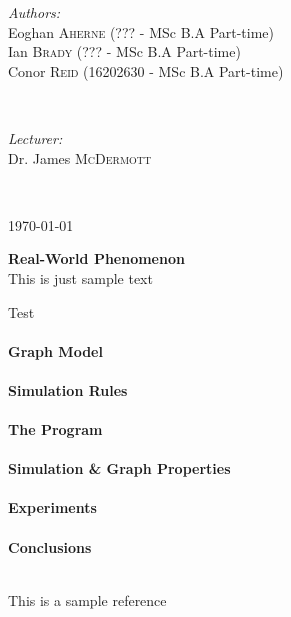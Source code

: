 \documentclass[paper=a4, fontsize=11pt]{scrartcl} %
\begin{document}
\begin{titlepage}
\begin{minipage}{0.4\textwidth}
\begin{flushleft} \large
\emph{Authors:}\\
\small{
Eoghan \textsc{Aherne} (??? - MSc B.A Part-time)
\\ Ian \textsc{Brady} (??? - MSc B.A Part-time)
\\Conor \textsc{Reid} (16202630 - MSc B.A Part-time)
} %
\end{flushleft}
\end{minipage}
~
\begin{minipage}{0.4\textwidth}
\begin{flushright} \large
\emph{Lecturer:} \\
Dr. James \textsc{McDermott} %
\end{flushright}
\end{minipage}\\[4cm]


\vspace{5cm}

{\large \today}\\[3cm] %

\vfill %

\end{titlepage}
\clearpage
\onecolumn
\setlength{\parindent}{10ex}
\clearpage
{\noindent \bf \large Real-World Phenomenon}\\
{\noindent This is just sample text }
\par {\lipsum[2]}
\par{\lipsum[3]}
\par{Test}
\\\\
{\noindent \bf \large Graph Model}\\\\
{\noindent \bf \large Simulation Rules}\\\\
{\noindent \bf \large The Program}\\\\
{\noindent \bf \large Simulation \& Graph Properties}\\\\
{\noindent \bf \large Experiments}\\\\
{\noindent \bf \large Conclusions}\\\\
\clearpage
\begin{thebibliography}{9}

  This is a sample reference

\end{thebibliography}
\end{document}
